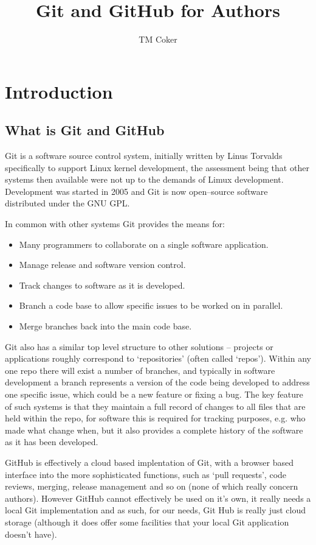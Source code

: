 \documentclass[a4paper, 12pt]{article}
\title{Git and GitHub for Authors}
\author{TM Coker}
\begin{document}
\maketitle
\section{Introduction}
\subsection{What is Git and GitHub}
Git is a software source control system, initially written by Linus Torvalds specifically to support Linux kernel development, the assessment being that other systems then available were not up to the demands of Limux development. Development was started in 2005 and Git is now open--source software distributed under the GNU GPL.

In common with other systems Git provides the means for:
\begin{itemize}
\item Many programmers to collaborate on a single software application.
\item Manage release and software version control.
\item Track changes to software as it is developed.
\item Branch a code base to allow specific issues to be worked on in parallel.
\item Merge branches back into the main code base.
\end{itemize}

Git also has a similar top level structure to other solutions -- projects or applications roughly correspond to `repositories' (often called `repos'). Within any one repo there will exist a number of branches, and typically in software development a branch represents a version of the code being developed to address one specific issue, which could be a new feature or fixing a bug. The key feature of such systems is that they maintain a full record of changes to all files that are held within the repo, for software this is required for tracking purposes, e.g. who made what change when, but it also provides a complete history of the software as it has been developed.

GitHub is effectively a cloud based implentation of Git, with a browser based interface into the more sophisticated functions, such as `pull requests', code reviews, merging, release management and so on (none of which really concern authors). However GitHub cannot effectively be used on it's own, it really needs a local Git implementation and as such, for our needs, Git Hub is really just cloud storage (although it does offer some facilities that your local Git application doesn't have).
\end{document}
